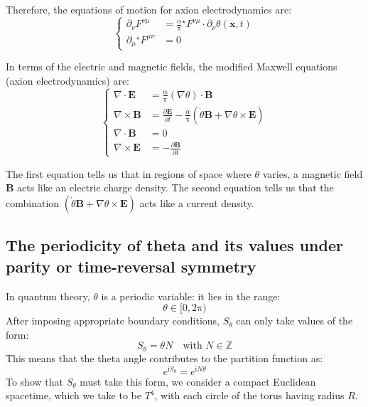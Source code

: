 Therefore, the equations of motion for axion electrodynamics are:
\begin{equation}
\left\{
\begin{aligned}
\partial_\nu F^{\nu\mu} &= \frac{\alpha}{\mathrm{\pi}} {}^\star F^{\nu\mu} \cdot \partial_\nu \theta(\bm{x}, t) \\
\partial_\mu {}^\star F^{\mu\nu} &= 0
\end{aligned}
\right.
\end{equation}

In terms of the electric and magnetic fields, the modified Maxwell equations (axion electrodynamics) are:
\begin{equation}
\left\{
\begin{aligned}
\nabla \cdot \bm{E} &= \frac{\alpha}{\mathrm{\pi}} (\nabla \theta) \cdot \bm{B} \\
\nabla \times \bm{B} &= \frac{\partial \bm{E}}{\partial t} - \frac{\alpha}{\mathrm{\pi}} (\dot{\theta} \bm{B} + \nabla \theta \times \bm{E}) \\
\nabla \cdot \bm{B} &= 0 \\
\nabla \times \bm{E} &= - \frac{\partial \bm{B}}{\partial t}
\end{aligned}
\right.
\end{equation}

The first equation tells us that in regions of space where $\theta$ varies, a magnetic field $\bm{B}$ acts like an electric charge density. The second equation tells us that the combination $(\dot{\theta}\bm{B} + \nabla\theta \times \bm{E})$ acts like a current density.

\subsection{The periodicity of theta and its values under parity or time-reversal symmetry}

In quantum theory, $\theta$ is a periodic variable: it lies in the range:
\begin{equation}
\theta \in [0, 2\mathrm{\pi})
\end{equation}
After imposing appropriate boundary conditions, $S_\theta$ can only take values of the form:
\begin{equation}
S_\theta = \theta N \quad \text{with } N \in \mathbb{Z}
\end{equation}
This means that the theta angle contributes to the partition function as:
\begin{equation}
e^{\mathrm{i}S_\theta} = e^{\mathrm{i}N\theta}
\end{equation}
To show that $S_\theta$ must take this form, we consider a compact Euclidean spacetime, which we take to be $T^4$, with each circle of the torus having radius $R$.

